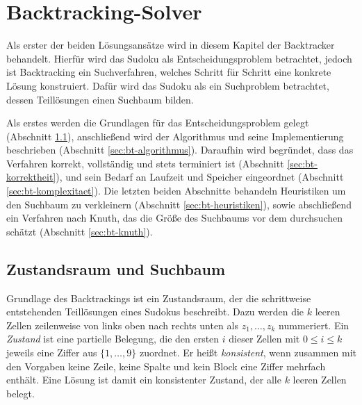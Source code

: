 

\section{Backtracking-Solver}\label{sec:bt}

Als erster der beiden Lösungsansätze wird in diesem Kapitel der Backtracker behandelt.
Hierfür wird das Sudoku als Entscheidungsproblem betrachtet, jedoch ist Backtracking ein
Suchverfahren, welches Schritt für Schritt eine konkrete Lösung konstruiert. 
Dafür wird das Sudoku als ein Suchproblem betrachtet, dessen Teillösungen einen Suchbaum bilden.

Als erstes werden die Grundlagen für das Entscheidungsproblem gelegt (Abschnitt \ref{sec:bt-suchbaum}),
anschließend wird der Algorithmus und seine Implementierung beschrieben (Abschnitt \ref{sec:bt-algorithmus}).
Daraufhin wird begründet, dass das Verfahren korrekt, vollständig und stets terminiert ist (Abschnitt \ref{sec:bt-korrektheit}),
und sein Bedarf an Laufzeit und Speicher eingeordnet (Abschnitt \ref{sec:bt-komplexitaet}).
Die letzten beiden Abschnitte behandeln Heuristiken um den Suchbaum zu verkleinern (Abschnitt \ref{sec:bt-heuristiken}),
sowie abschließend ein Verfahren nach Knuth, das die Größe des Suchbaums vor dem durchsuchen schätzt (Abschnitt \ref{sec:bt-knuth}). 

\subsection{Zustandsraum und Suchbaum}\label{sec:bt-suchbaum}

Grundlage des Backtrackings ist ein Zustandsraum, der die schrittweise entstehenden Teillösungen eines Sudokus beschreibt.
Dazu werden die $k$ leeren Zellen zeilenweise von links oben nach rechts unten als $z_1, \dots, z_k$ nummeriert. 
Ein \emph{Zustand} ist eine partielle Belegung, die den ersten $i$ dieser Zellen mit $0 \leq i \leq k$ 
jeweils eine Ziffer aus $\{1, \dots, 9\}$ zuordnet. 
Er heißt \emph{konsistent}, wenn zusammen mit den Vorgaben keine Zeile, keine Spalte und kein Block eine Ziffer mehrfach enthält. 
Eine Lösung ist damit ein konsistenter Zustand, der alle $k$ leeren Zellen belegt.


